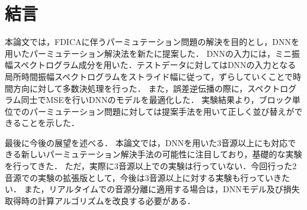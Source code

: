 \chapter{結言}
\label{chap:con}

本論文では，FDICAに伴うパーミュテーション問題の解決を目的とし，DNNを用いたパーミュテーション解決法を新たに提案した．
DNNの入力には，ミニ振幅スペクトログラム成分を用いた．テストデータに対してはDNNの入力となる局所時間振幅スペクトログラムをストライド幅に従って，ずらしていくことで時間方向に対して多数決処理を行った．
また，誤差逆伝播の際に，スペクトログラム同士でMSEを行いDNNのモデルを最適化した．
実験結果より，ブロック単位でのパーミュテーション問題に対しては提案手法を用いて正しく並び替えができることを示した．

最後に今後の展望を述べる．
本論文では，DNNを用いた3音源以上にも対応できる新しいパーミュテーション解決手法の可能性に注目しており，基礎的な実験を行ってきた．
ただ，実際に3音源以上での実験は行っていない．今回行った2音源での実験の拡張版として，今後は3音源以上に対する実験も行っていきたい．
また，リアルタイムでの音源分離に適用する場合は，DNNモデル及び損失取得時の計算アルゴリズムを改良する必要がある．
